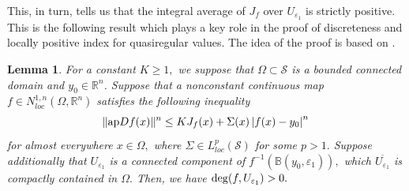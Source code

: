 \documentclass[11pt,twoside]{article}
\newtheorem{lem}[thm]{Lemma}
\theoremstyle{definition}
\theoremstyle{remark}
\newcommand{\abs}[1]{\left|#1\right|}
\begin{document}
This, in turn, tells us that the integral average of  $J_{f}$ over $U_{\varepsilon_{1}}$ is strictly positive. This is the following result which plays a key role in the proof of discreteness and locally positive index  for quasiregular values. The idea of the proof is based on \cite{KO222, Zho251}.
\begin{lem}\label{bgjxolohcn}
For a constant $K\geq1,$ we suppose that $\Omega\subset\mathcal{S}$ is a bounded connected domain and $y_{0}\in\mathbb{R}^{n}$. Suppose that a nonconstant continuous map $f\in N_{loc}^{1,n}(\Omega,\mathbb{R}^{n})$ 
 satisfies the following inequality
\begin{equation}\label{jjksxc}
\| {\rm ap}Df(x)\|^{n}\leq KJ_{f}(x)+\Sigma(x)\abs{f(x)-y_{0}}^{n}
\end{equation}
for almost everywhere $x\in\Omega,$ where  $\Sigma\in L_{loc}^{p}(\mathcal{S})$ for some $p>1.$   Suppose additionally that $U_{\varepsilon_{1}}$ is a connected component of $f^{-1}(\mathbb{B}(y_{0},\varepsilon_{1})),$ which $\overline{U_{\varepsilon_{1}}}$ is compactly contained in $\Omega.$ Then, we have
${\rm deg}(f,U_{\varepsilon_{1}})>0.$
\end{lem}
\end{document}
